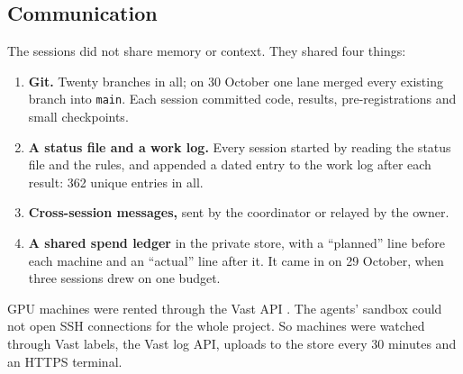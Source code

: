 \documentclass[11pt]{article}
\begin{document}
\subsection{Communication}
The sessions did not share memory or context. They shared four things:

\begin{enumerate}[itemsep=2pt,topsep=3pt]
\item \textbf{Git.} Twenty branches in all; on 30 October one lane merged every existing branch into \texttt{main}. Each session committed code, results, pre-registrations and small checkpoints.
\item \textbf{A status file and a work log.} Every session started by reading the status file and the rules, and appended a dated entry to the work log after each result: 362 unique entries in all.
\item \textbf{Cross-session messages,} sent by the coordinator or relayed by the owner.
\item \textbf{A shared spend ledger} in the private store, with a ``planned'' line before each machine and an ``actual'' line after it. It came in on 29 October, when three sessions drew on one budget.
\end{enumerate}
GPU machines were rented through the Vast API \cite{r55}. The agents' sandbox could not open SSH connections for the whole project. So machines were watched through Vast labels, the Vast log API, uploads to the store every 30 minutes and an HTTPS terminal.
\end{document}
